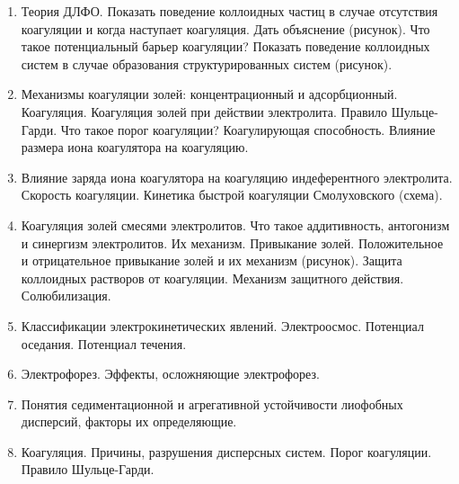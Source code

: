 \begin{enumerate}
\item 
Теория ДЛФО. Показать поведение коллоидных частиц в случае отсутствия коагуляции и когда наступает коагуляция. Дать объяснение (рисунок). Что такое потенциальный барьер коагуляции? Показать поведение коллоидных систем в случае образования структурированных систем (рисунок).

\item 
Механизмы коагуляции золей: концентрационный и адсорбционный. Коагуляция. Коагуляция золей при действии электролита. Правило Шульце-Гарди. Что такое порог коагуляции? Коагулирующая способность. Влияние размера иона коагулятора на коагуляцию. 

\item 
Влияние заряда иона коагулятора на коагуляцию индеферентного электролита. Скорость коагуляции. Кинетика быстрой коагуляции Смолуховского (схема).

\item 
Коагуляция золей смесями электролитов. Что такое аддитивность, антогонизм и синергизм электролитов. Их механизм. Привыкание золей. Положительное и отрицательное привыкание золей и их механизм (рисунок). Защита коллоидных растворов от коагуляции. Механизм защитного действия. Солюбилизация.

\item 
Классификации электрокинетических явлений. Электроосмос. Потенциал оседания. Потенциал течения.
 
\item 
Электрофорез. Эффекты, осложняющие электрофорез. 

\item 
Понятия седиментационной и агрегативной устойчивости лиофобных дисперсий, факторы их определяющие.
 
\item 
Коагуляция. Причины, разрушения дисперсных систем. Порог коагуляции. Правило Шульце-Гарди.

\end{enumerate}

